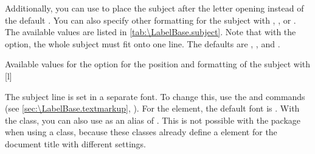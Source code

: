 Additionally, you can use %
 to place the subject after the letter
opening instead of the default . You can
also specify other formatting for the subject with
, , or
. The
available values are listed in \autoref{tab:\LabelBase.subject}.
Note that with the 
option, the whole subject must fit onto one line. The defaults are
, , and
.%
%
\begin{table}
  \setcapindent{0pt}%
  \begin{captionbeside}
    {Available values for the  option for the position and
      formatting of the subject with
      \label{tab:\LabelBase.subject}}%
    [l]
    \begin{minipage}[t]{.6\linewidth}
      \begin{desctabular}[t]
      \end{desctabular}
    \end{minipage}
  \end{captionbeside}
\end{table}

\BeginIndexGroup
{}%
%
The subject line is set in a separate font. To change this,
use the  and
 commands (see
\autoref{sec:\LabelBase.textmarkup},
). For the
 element,
the default font is . With the
 class, you can also use
 as an alias of
. This is not possible with the 
package when using a \KOMAScript{} class, because these classes already define
a  element for the document title with different
settings.%
\EndIndexGroup

